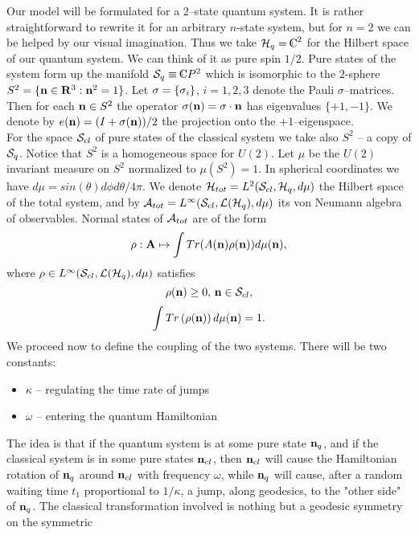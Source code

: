 \documentclass[12pt]{article}
\def\complex{{\kern .1em {\raise .47ex \hbox
{$\scriptscriptstyle
|$}}
\kern -.4em {\rm C}}}
\begin{document}
Our model will be formulated for a $2$--state quantum system.  It is
rather straightforward to rewrite it for an arbitrary $n$-state system, 
but for $n=2$ we can be helped by our visual imagination.  Thus we take
${\cal H}_q=\complex^2$ for the Hilbert space of our quantum system.  We
can think of it as pure spin $1/2$.  Pure states of the system form up
the manifold ${\cal S}_q\equiv\complex P^2$ which is isomorphic to the
$2$-sphere $S^2=\{ {\bf n}\in {\bf R}^3: {\bf n}^2=1\}$. 
Let ${\bf \sigma}=\{\sigma_i\}$, 
$i=1, 2, 3$ denote the Pauli $\sigma$--matrices.  Then for each ${\bf n}\in S^2$
the operator $\sigma ({\bf n})={\bf\sigma\cdot n}$ has eigenvalues
$\{+1, -1\} $.  We denote by $e ({\bf n})= (I+\sigma ({\bf n}))/2$ the projection
onto the $+1$--eigenspace.  \\
For the space ${\cal S}_{cl}$ of pure states of the classical system we
take also $S^2$ -- a copy of ${\cal S}_q$.  Notice that
$S^2$ is a homogeneous space for $U (2)$.  Let $\mu$ be the $U (2)$
invariant measure on $S^2$ normalized to $\mu  (S^2)=1$.  In spherical
coordinates we have $d\mu=sin (\theta)d\phi d\theta /4\pi$. 
We denote ${\cal H}_{tot}=L^2 ({\cal S}_{cl}, {\cal H}_q, d\mu )$ the 
Hilbert space of the total system,  and by 
${\cal A}_{tot}=L^{\infty} ({\cal S}_{cl}, 
{\cal L} ({\cal H}_q), d\mu )$ its von Neumann algebra of observables. 
 Normal states of ${\cal A}_{tot}$ are 
of the form $$\rho: {\bf A}\mapsto\int Tr (A ({\bf n})\rho ({\bf n}))d\mu ({\bf n}), $$
where
$\rho\in L^{\infty} ({\cal S}_{cl},  {\cal L} ({\cal H}_q), d\mu )$  satisfies
$$\rho  ({\bf n})\geq 0 , \,  {\bf n}\in {\cal S}_{cl} , $$
$$\int Tr \left (\rho  ({\bf n})\right) d\mu  ({\bf n}) =1 . $$
We proceed now to define the coupling of the two systems.  There will be two
constants:  
\begin{itemize}
\item $\kappa$ -- regulating the time rate of jumps 
\item $\omega$ -- entering the quantum Hamiltonian 
\end{itemize}
 The idea is that if the quantum system is at some pure state
${\bf n}_q$,  and if the classical system is in some pure states ${\bf n}_{cl}$, 
then
${\bf n}_{cl}$ will cause 
the Hamiltonian rotation of ${\bf n}_{q}$  around
${\bf n}_{cl}$ with frequency $\omega$,  while ${\bf n}_q$ will cause,  
after a random waiting time $t_1$ proportional to $1/\kappa$,  
a jump,  along geodesics,  to the "other side" of ${\bf n}_q$. 
The classical transformation involved 
is nothing but a geodesic symmetry on the symmetric
\end{document}

